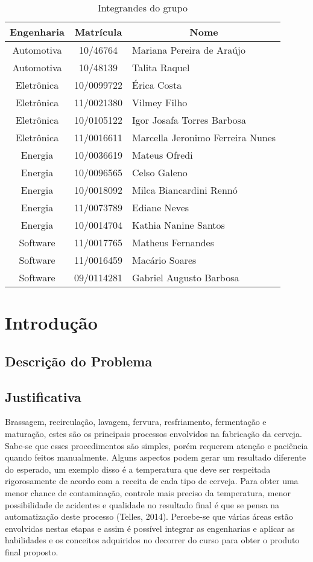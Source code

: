 \begin{table}[]
\centering
\caption{Integrandes do grupo}
\begin{tabular}{|c|c|l|}
\hline
{\bf Engenharia} & {\bf Matrícula} & \multicolumn{1}{c|}{{\bf Nome}} \\ \hline
Automotiva &  10/46764 & Mariana Pereira  de Araújo \\ \hline
Automotiva &  10/48139 &    Talita Raquel \\ \hline
Eletrônica &  10/0099722 &  Érica Costa \\ \hline
Eletrônica &  11/0021380 &  Vilmey Filho \\ \hline
Eletrônica &  10/0105122 &  Igor Josafa Torres Barbosa \\ \hline
Eletrônica &  11/0016611 &  Marcella Jeronimo Ferreira Nunes \\ \hline
Energia & 10/0036619 &  Mateus Ofredi \\ \hline
Energia & 10/0096565 &  Celso Galeno \\ \hline
Energia &  10/0018092 & Milca Biancardini Rennó \\ \hline
Energia & 11/0073789 &  Ediane Neves \\ \hline
Energia & 10/0014704 &  Kathia Nanine Santos \\ \hline
Software &    11/0017765 &  Matheus Fernandes \\ \hline
Software &    11/0016459 &  Macário Soares \\ \hline
Software &    09/0114281 &  Gabriel Augusto Barbosa \\ \hline
\end{tabular}
\end{table}


\clearpage
\section{Introdução}
    \subsection{Descrição do Problema}

    \subsection{Justificativa}
    Brassagem, recirculação, lavagem, fervura, resfriamento, fermentação e maturação, estes são os principais processos envolvidos na fabricação da cerveja. Sabe-se que esses procedimentos são simples, porém requerem atenção e paciência quando feitos manualmente. Alguns aspectos podem gerar um resultado diferente do esperado, um exemplo disso é a temperatura que deve ser respeitada rigorosamente de acordo com a receita de cada tipo de cerveja. Para obter uma menor chance de contaminação, controle mais preciso da temperatura, menor possibilidade de acidentes e qualidade no resultado final é que se pensa na automatização deste processo (Telles, 2014).  Percebe-se que várias áreas estão envolvidas nestas etapas e assim é possível integrar as engenharias e aplicar as habilidades e os conceitos adquiridos no decorrer do curso para obter o produto final proposto.

